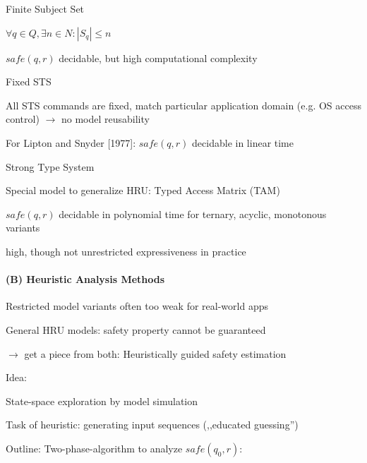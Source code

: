 \documentclass[a4paper]{article}
\begin{document}
\begin{multicols}{3}
    Finite Subject Set
    \begin{itemize*}
        \item $\forall q\in Q,\exists n\in N: |S_q|\leq n$
        \item $safe(q,r)$ decidable, but high computational complexity
    \end{itemize*}

    Fixed STS
    \begin{itemize*}
        \item All STS commands are fixed, match particular application domain (e.g. OS access control) $\rightarrow$  no model reusability
        \item For Lipton and Snyder [1977]: $safe(q,r)$ decidable in linear time
    \end{itemize*}

    Strong Type System
    \begin{itemize*}
        \item Special model to generalize HRU: Typed Access Matrix (TAM)
        \item $safe(q,r)$ decidable in polynomial time for ternary, acyclic, monotonous variants
        \item high, though not unrestricted expressiveness in practice
    \end{itemize*}

    \paragraph{(B) Heuristic Analysis Methods}
    \begin{itemize*}
        \item Restricted model variants often too weak for real-world apps
        \item General HRU models: safety property cannot be guaranteed
        \item $\rightarrow$ get a piece from both: Heuristically guided safety estimation
    \end{itemize*}

    Idea:
    \begin{itemize*}
        \item State-space exploration by model simulation
        \item Task of heuristic: generating input sequences (,,educated guessing'')
    \end{itemize*}

    Outline: Two-phase-algorithm to analyze $safe(q_0,r)$:
    \begin{enumerate*}


\end{enumerate*}
\end{multicols}
\end{document}
